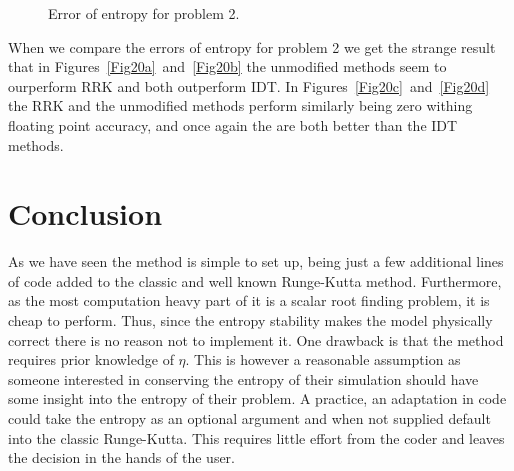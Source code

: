 \documentclass{article}
\newcommand{\norm}[1]{\left\lVert#1\right\rVert}
\newcommand{\inner}[2]{\left< #1 , #2 \right>}
\begin{document}
\begin{figure}[H]
        \hfill
        \caption{Error of entropy for problem 2.}\label{Fig20}
    \end{figure}

    When we compare the errors of entropy for problem 2 we get the strange result that in Figures~\ref{Fig20a}~and~\ref{Fig20b} the unmodified methods seem to ourperform RRK and both outperform IDT. In Figures~\ref{Fig20c}~and~\ref{Fig20d} the RRK and the unmodified methods perform similarly being zero withing floating point accuracy, and once again the are both better than the IDT methods.

\section{Conclusion}
As we have seen the method is simple to set up, being just a few additional lines of code added to the classic and well known Runge-Kutta method.
Furthermore, as the most computation heavy part of it is a scalar root finding problem, it is cheap to perform.
Thus, since the entropy stability makes the model physically correct there is no reason not to implement it.
One drawback is that the method requires prior knowledge of \(\eta\). This is however a reasonable assumption as someone interested in conserving the entropy of their simulation should have some insight into the entropy of their problem.
A practice, an adaptation in code could take the entropy as an optional argument and when not supplied default into the classic Runge-Kutta. This requires little effort from the coder and leaves the decision in the hands of the user.

{}

\end{document}
